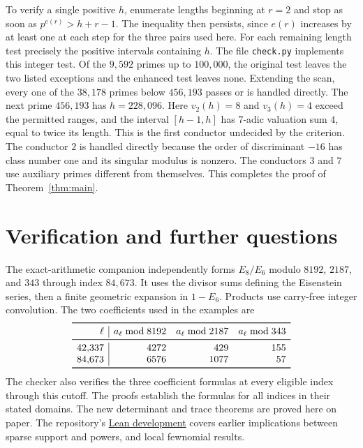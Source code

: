 \documentclass[11pt]{article}
\begin{document}
To verify a single positive $h$, enumerate lengths beginning at $r=2$ and stop as soon as $p^{e(r)}>h+r-1$. The inequality then persists, since $e(r)$ increases by at least one at each step for the three pairs used here. For each remaining length test precisely the positive intervals containing $h$. The file \texttt{check.py} implements this integer test. Of the $9{,}592$ primes up to $100{,}000$, the original test leaves the two listed exceptions and the enhanced test leaves none. Extending the scan, every one of the $38{,}178$ primes below $456{,}193$ passes or is handled directly. The next prime $456{,}193$ has $h=228{,}096$. Here $v_2(h)=8$ and $v_3(h)=4$ exceed the permitted ranges, and the interval $[h-1,h]$ has $7$-adic valuation sum $4$, equal to twice its length. This is the first conductor undecided by the criterion. The conductor $2$ is handled directly because the order of discriminant $-16$ has class number one and its singular modulus is nonzero. The conductors $3$ and $7$ use auxiliary primes different from themselves. This completes the proof of Theorem~\ref{thm:main}.

\section{Verification and further questions}
The exact-arithmetic companion independently forms $E_8/E_6$ modulo $8192$, $2187$, and $343$ through index $84{,}673$. It uses the divisor sums defining the Eisenstein series, then a finite geometric expansion in $1-E_6$. Products use carry-free integer convolution. The two coefficients used in the examples are
\[
\begin{array}{r|rrr}
\toprule
\ell &a_\ell\bmod8192 &a_\ell\bmod2187 &a_\ell\bmod343\\\midrule
42{,}337&4272&429&155\\
84{,}673&6576&1077&57\\\bottomrule
\end{array}
\]
The checker also verifies the three coefficient formulas at every eligible index through this cutoff. The proofs establish the formulas for all indices in their stated domains. The new determinant and trace theorems are proved here on paper. The repository's \href{https://github.com/VladimirReshetnikov/ProveIt/tree/497c1844e71393df41914f5b783d5dc9a618eb61/Analysis/GeneralizedRiemannHypothesis/Lean}{Lean development} covers earlier implications between sparse support and powers, and local fewnomial results.
\end{document}
